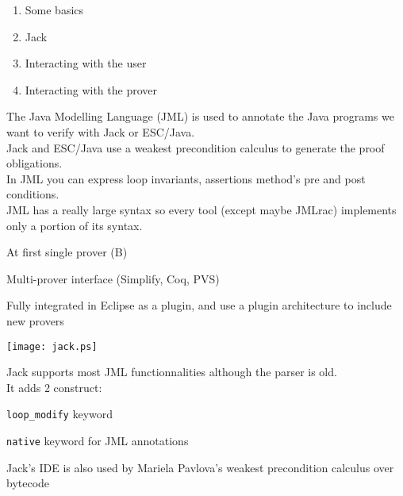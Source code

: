 \begin{enumerate}
\item Some basics
\item Jack
\item Interacting with the user
\item Interacting with the prover
\end{enumerate}

\small
The {\purple Java Modelling Language} (JML)
is used to annotate the Java programs we want to verify with 
Jack or ESC/Java.\\
Jack and ESC/Java use a {\purple weakest precondition calculus} to generate
the proof obligations.\\
In JML you can express loop invariants, assertions method's
pre and post conditions.\\
JML has a really large syntax so every tool (except maybe JMLrac)
implements only a {\purple portion} of its syntax.


\small
\blist
\item At first single prover (B)
\item Multi-prover interface (Simplify, Coq, PVS)
\item Fully integrated in {\purple Eclipse} as a plugin, and use a 
{\purple plugin architecture} to include new provers
\elist
\begin{center}
\texttt{[image: jack.ps]}
\end{center}

\small
Jack supports most JML functionnalities although the parser is old.\\
It adds 2 construct:
\blist
\item {\tt loop\_modify} keyword
\item {\tt native} keyword for JML annotations\\
\elist

Jack's IDE is also used by Mariela Pavlova's 
weakest precondition calculus over bytecode
